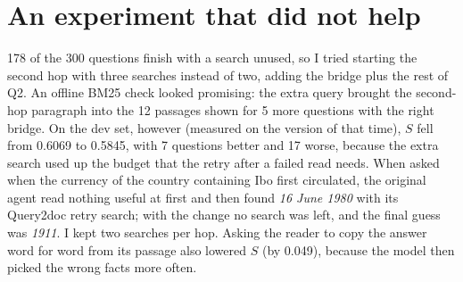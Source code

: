\documentclass[10pt,a4paper]{article}
\begin{document}
\section{An experiment that did not help}
178 of the 300 questions finish with a search unused, so I tried starting the second hop with three searches instead of two,
adding the bridge plus the rest of Q2. An offline BM25 check looked promising: the extra query brought the
second-hop paragraph into the 12 passages shown for 5 more questions with the right bridge. On the dev set, however (measured on the version of that time),
$S$ fell from 0.6069 to 0.5845, with 7 questions better and 17 worse, because the extra search used up the budget
that the retry after a failed read needs. When asked when the currency of the country containing Ibo first
circulated, the original agent read nothing useful at first and then found \emph{16 June 1980} with its Query2doc
retry search; with the change no search was left, and the final guess was \emph{1911}. I kept two searches per hop. Asking the reader to copy the answer word for word from
its passage also lowered $S$ (by 0.049), because the model then picked the wrong facts more often.

\end{document}
